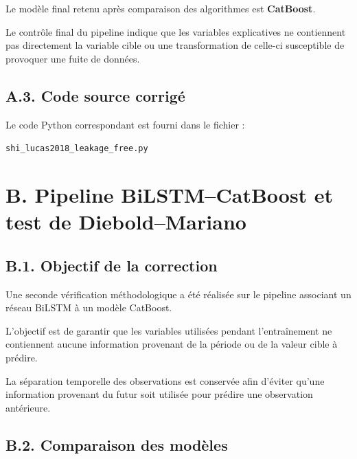 \documentclass[12pt, a4paper, oneside, french]{report}
\begin{document}
Le modèle final retenu après comparaison des algorithmes est
\textbf{CatBoost}.



Le contrôle final du pipeline indique que les variables explicatives ne
contiennent pas directement la variable cible ou une transformation de
celle-ci susceptible de provoquer une fuite de données.

\subsection*{A.3. Code source corrigé}

Le code Python correspondant est fourni dans le fichier :

\begin{center}
\texttt{shi\_lucas2018\_leakage\_free.py}
\end{center}




\section*{B. Pipeline BiLSTM--CatBoost et test de Diebold--Mariano}

\subsection*{B.1. Objectif de la correction}

Une seconde vérification méthodologique a été réalisée sur le pipeline
associant un réseau BiLSTM à un modèle CatBoost.

L'objectif est de garantir que les variables utilisées pendant l'entraînement
ne contiennent aucune information provenant de la période ou de la valeur
cible à prédire.

La séparation temporelle des observations est conservée afin d'éviter qu'une
information provenant du futur soit utilisée pour prédire une observation
antérieure.

\subsection*{B.2. Comparaison des modèles}
\end{document}
